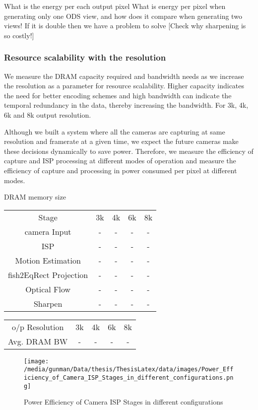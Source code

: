 What is the energy per each output pixel	
What is energy per pixel when generating only one ODS view, and how does it compare when generating two views! If it is double then we have a problem to solve	
[Check why sharpening is so costly!]

\subsubsection{Resource scalability with the resolution}
We measure the DRAM capacity required and bandwidth needs as we increase the resolution as a parameter for resource scalability. Higher capacity indicates the need for better encoding schemes and high bandwidth can indicate the temporal redundancy in the data, thereby increasing the bandwidth. For 3k, 4k, 6k and 8k output resolution.

Although we built a system where all the cameras are capturing at same resolution and framerate at a given time, we expect the future cameras make these decisions dynamically to save power. Therefore, we  measure the efficiency of capture and ISP processing at different modes of operation and measure the efficiency of capture and processing in power consumed per pixel at different modes.

DRAM memory size\newline
\begin{tabular}{c|c|c|c|c}
	Stage & 3k & 4k & 6k & 8k \\
	camera Input & - & - & - & - \\
	ISP & - & - & - & - \\
	Motion Estimation & - & - & - & - \\
	fish2EqRect Projection & - & - & - & - \\
	Optical Flow & - & - & - & - \\
	Sharpen & - & - & - & - \\
\end{tabular} 

\vspace{10mm}
\begin{tabular}{c|c|c|c|c}
	o/p Resolution & 3k & 4k & 6k & 8k \\
	Avg. DRAM BW & - & - & - & - \\
\end{tabular} 
\vspace{30mm}

\begin{figure*}
	\begin{center}
		\texttt{[image: /media/gunman/Data/thesis/ThesisLatex/data/images/Power\_Efficiency\_of\_Camera\_ISP\_Stages\_in\_different\_configurations.png]}
		\caption{Power Efficiency of Camera ISP Stages in different configurations}
		\label{fig:ex_4_9}
	\end{center}
	\vspace{-0.3in}
\end{figure*} 


